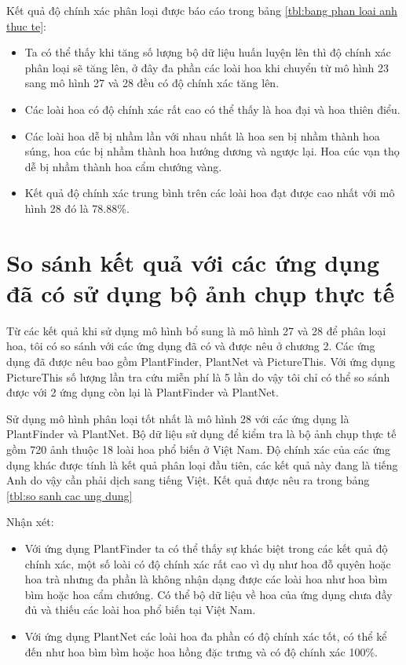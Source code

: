 \documentclass[12pt]{report}
\begin{document}
		Kết quả độ chính xác phân loại được báo cáo trong bảng \ref{tbl:bang phan loai anh thuc te}: 		
		\begin{itemize}
			\item Ta có thể thấy khi tăng số lượng bộ dữ liệu huấn luyện lên thì
			độ chính xác phân loại sẽ tăng lên, ở đây đa phần các loài hoa khi chuyển từ mô hình 23 sang mô hình 27 và 28 đều có độ 
			chính xác tăng lên.
			\item Các loài hoa có độ chính xác rất cao có thể thấy là hoa đại và hoa thiên điểu.
			\item Các loài hoa dễ bị nhầm lần với nhau nhất là hoa sen bị nhầm thành hoa súng, hoa cúc bị nhầm thành hoa hướng dương và ngược lại. Hoa cúc vạn thọ dễ bị nhầm thành hoa cẩm chướng vàng.
			\item Kết quả độ chính xác trung bình trên các loài hoa đạt được cao nhất với mô hình 28 đó là 78.88\%.
		\end{itemize}\newpage


		\section{So sánh kết quả với các ứng dụng đã có sử dụng bộ ảnh chụp thực tế}
		Từ các kết quả khi sử dụng mô hình bổ sung là mô hình 27 và 28 để phân loại hoa, tôi có so sánh với các ứng dụng đã có và được nêu ở chương 2. 
		Các ứng dụng đã được nêu bao gồm PlantFinder, PlantNet và PictureThis. Với ứng dụng PictureThis số lượng lần tra cứu miễn phí là 5 lần
		do vậy tôi chỉ có thể so sánh được với 2 ứng dụng còn lại là PlantFinder và PlantNet.

		Sử dụng mô hình phân loại tốt nhất là mô hình 28 với các ứng dụng là PlantFinder và PlantNet. Bộ dữ liệu sử dụng để kiểm tra là bộ ảnh chụp thực tế gồm 720 ảnh thuộc 18 loài hoa
		phổ biến ở Việt Nam. Độ chính xác của các ứng dụng khác được tính là kết quả phân loại đầu tiên, các kết quả này đang là tiếng Anh do vậy cần phải dịch sang tiếng Việt.
		Kết quả được nêu ra trong bảng \ref{tbl:so sanh cac ung dung}

		Nhận xét: 		
		\begin{itemize}
			\item Với ứng dụng PlantFinder ta có thể thấy sự khác biệt trong các kết quả độ chính xác, một số loài có độ chính xác rất cao vì dụ như hoa đỗ quyên hoặc hoa trà nhưng đa phần là không nhận dạng được các loài hoa như hoa bìm bìm hoặc hoa cẩm chướng. Có thể bộ dữ liệu về hoa của ứng dụng chưa đầy đủ và thiếu các loài hoa phổ biến tại Việt Nam.
			\item Với ứng dụng PlantNet các loài hoa đa phần có độ chính xác tốt, có thể kể đến như hoa bìm bìm hoặc hoa hồng đặc trưng và có độ chính xác 100\%.
		\end{itemize}
\end{document}
